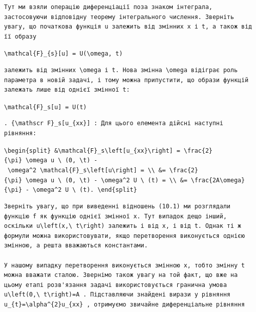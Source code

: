 \documentclass[
  ukrainian,
]{article}
\begin{document}
\begin{verbatim}
Тут ми взяли операцію диференціації поза знаком інтеграла, застосовуючи відповідну теорему інтегрального числення. Зверніть увагу, що початкова функція u залежить від змінних x і t, а також від її образу
\end{verbatim}

\texttt{\textbackslash{}mathcal\{F\}\_\{s\}{[}u{]}\ =\ U(\textbackslash{}omega,\ t)}

\begin{verbatim}
залежить від змінних \omega і t. Нова змінна \omega відіграє роль параметра в новій задачі, і тому можна припустити, що образи функцій залежать лише від однієї змінної t:
\end{verbatim}

\texttt{\textbackslash{}mathcal\{F\}\_s{[}u{]}\ =\ U(t)}

\begin{verbatim}
. {\mathscr F}_s[u_{xx}] : Для цього елемента дійсні наступні рівняння:
\end{verbatim}

\texttt{\textbackslash{}begin\{split\}\ \&\textbackslash{}mathcal\{F\}\_s\textbackslash{}left{[}u\_\{xx\}\textbackslash{}right{]}\ =\ \textbackslash{}frac\{2\}\{\textbackslash{}pi\}\ \textbackslash{}omega\ u\ \textbackslash{}\ (0,\ \textbackslash{}t)\ -\ \textbackslash{}omega\^{}2\ \textbackslash{}mathcal\{F\}\_s\textbackslash{}left{[}u\textbackslash{}right{]}\ =\ \textbackslash{}\textbackslash{}\ \&=\ \textbackslash{}frac\{2\}\{\textbackslash{}pi\}\ \textbackslash{}omega\ u\ \textbackslash{}\ (0,\ \textbackslash{}t)\ -\ \textbackslash{}omega\^{}2\ U\ \textbackslash{}\ (t)\ =\ \textbackslash{}\textbackslash{}\ \&=\ \textbackslash{}frac\{2A\textbackslash{}omega\}\{\textbackslash{}pi\}\ -\ \textbackslash{}omega\^{}2\ U\ \textbackslash{}\ (t).\ \textbackslash{}end\{split\}}

\begin{verbatim}
Зверніть увагу, що при виведенні відношень (10.1) ми розглядали функцію f як функцію однієї змінної x. Тут випадок дещо інший, оскільки u\left(x,\ t\right) залежить і від x, і від t. Однак ті ж формули можна використовувати, якщо перетворення виконується однією змінною, а решта вважаються константами.

У нашому випадку перетворення виконується змінною x, тобто змінну t можна вважати сталою. Звернімо також увагу на той факт, що вже на цьому етапі розв'язання задачі використовується гранична умова u\left(0,\ t\right)=A . Підставляючи знайдені вирази у рівняння u_{t}=\alpha^{2}u_{xx} , отримуємо звичайне диференціальне рівняння
\end{verbatim}
\end{document}
